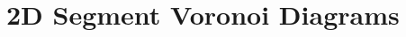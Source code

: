 
\chapter{2D Segment Voronoi Diagrams}
\label{chapter-segvor2}

\vspace*{-10mm}
\minitoc
\vspace*{30mm}



